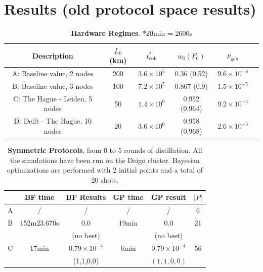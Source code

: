 \documentclass{article}
\begin{document}
\clearpage
\section*{Results (old protocol space results)}

\begin{table}[ht!]
    \centering
    \begin{tabular}{|c|c|c|c|c|c|}
        \hline
        Description & $L_0$ (km) & $t_{\text{coh}}^*$ & $w_0 (F_0)$ & $p_{gen}$ \\
        \hline
        \hline
        A: Baseline value, 2 nodes & 200  & $3.6 \times 10^5$ & 0.36 (0.52) & $9.6 \times 10^{-8}$ \\
        \hline
        B: Baseline value, 3 nodes & 100  & $7.2 \times 10^5$ & 0.867 (0.9) & $1.5 \times 10^{-5}$ \\
        \hline
        C: The Hague - Leiden, 5 nodes & 50  & $1.4 \times 10^6$ & 0.952 (0.964) & $9.2 \times 10^{-4}$ \\
        \hline
        D: Delft - The Hague, 10 nodes & 20  & $3.6 \times 10^6$ & 0.958 (0.968) & $2.6 \times 10^{-3}$ \\
        \hline
    \end{tabular}
    \caption{\textbf{Hardware Regimes}. \quad **20min = 2600s}
    \label{tab:hardware_regimes}
\end{table}

\begin{table}[ht!]
    \centering
    \begin{tabular}{|c|c|c|c|c|c|}
        \hline
        & BF time & BF Results & GP time & GP result & $|P|$ \\
        \hline
        \hline
        A & / & / & / & / & 6 \\
        \hline
        B & 152m23.670s & 0.0 & 19min & 0.0 & 21 \\
        & & (no best) & & (no best) & \\
        \hline
        C & 17min & $0.79 \times 10^{-4}$ & 6min & $0.79 \times 10^{-4}$ & 56 \\
        & & (1,1,0,0) & & $(1,1,0,0)$ & \\
        \hline
    \end{tabular}
    \caption{\textbf{Symmetric Protocols}, from 0 to 5 rounds of distillation. All the simulations have been run on the Deigo cluster. Bayesian optimizations are performed with 2 initial points and a total of 20 shots.}
    \label{tab:symmetric_protocols}
\end{table}
\end{document}

